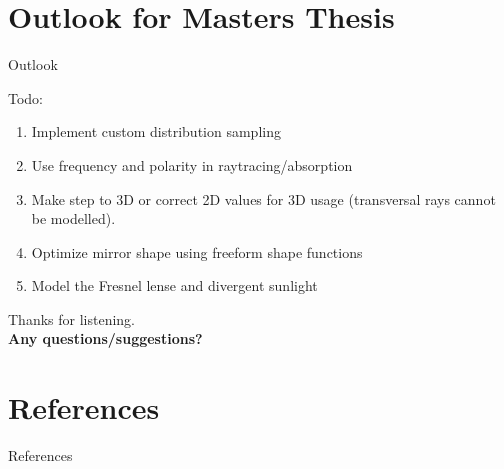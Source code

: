 \documentclass[aspectratio=43,t]{beamer}
\begin{document}
	\section{Outlook for Masters Thesis}

		\begin{frame}[fragile]{Outlook}
    \begin{block}{Todo:}
      \begin{enumerate}
				\item<2-> Implement custom distribution sampling
        \item<3-> Use frequency and polarity in raytracing/absorption
				\item<4-> Make step to 3D or correct 2D values for 3D usage (transversal rays cannot
					be modelled).
        \item<5-> Optimize mirror shape using freeform shape functions
        \item<6-> Model the Fresnel lense and divergent sunlight
      \end{enumerate}
    \end{block}
    \end{frame}

  { %
    \begin{frame}[c,noframenumbering]
      \begin{center}
        Thanks for listening.\\
        {\bf Any questions/suggestions?}
      \end{center}
    \end{frame}

    \section*{References}
    \begin{frame}{References}
      \printbibliography
    \end{frame}
  }
	
\end{document}
